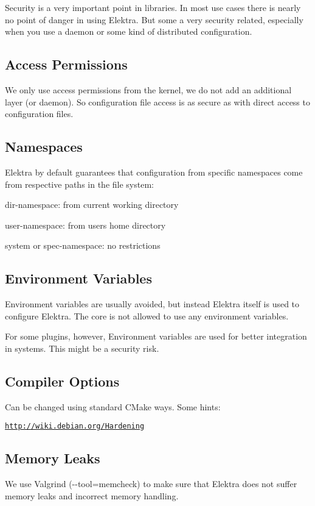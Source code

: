 Security is a very important point in libraries. In most use cases there is nearly no point of danger in using Elektra. But some a very security related, especially when you use a daemon or some kind of distributed configuration.

\subsection*{Access Permissions}

We only use access permissions from the kernel, we do not add an additional layer (or daemon). So configuration file access is as secure as with direct access to configuration files.

\subsection*{Namespaces}

Elektra by default guarantees that configuration from specific namespaces come from respective paths in the file system\+:


\begin{DoxyItemize}
\item {\ttfamily dir}-\/namespace\+: from current working directory
\item {\ttfamily user}-\/namespace\+: from users home directory
\item {\ttfamily system} or {\ttfamily spec}-\/namespace\+: no restrictions
\end{DoxyItemize}

\subsection*{Environment Variables}

Environment variables are usually avoided, but instead Elektra itself is used to configure Elektra. The core is not allowed to use any environment variables.

For some plugins, however, Environment variables are used for better integration in systems. This might be a security risk.

\subsection*{Compiler Options}

Can be changed using standard C\+Make ways. Some hints\+:

\href{http://wiki.debian.org/Hardening}{\tt http\+://wiki.\+debian.\+org/\+Hardening}

\subsection*{Memory Leaks}

We use Valgrind ({\ttfamily -\/-\/tool=memcheck}) to make sure that Elektra does not suffer memory leaks and incorrect memory handling. 